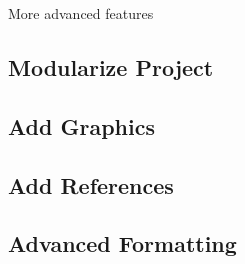 More advanced features
\subsection{Modularize Project}
\subsection{Add Graphics}\label{subsec:AddGraphics}
\subsection{Add References}
\subsection{Advanced Formatting}